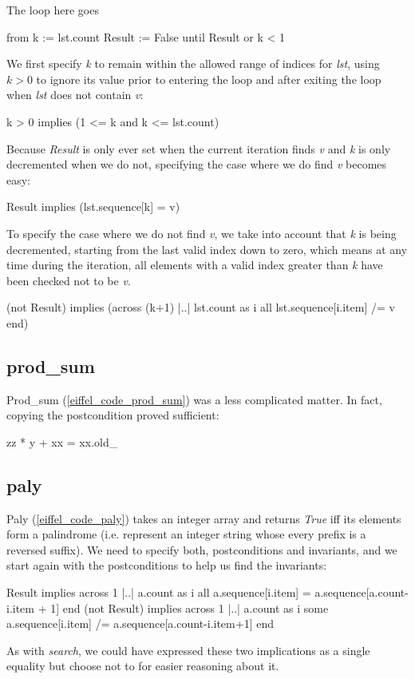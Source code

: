 The loop here goes
\begin{eSimple}
from
	k := lst.count
	Result := False
until
	Result or k < 1
\end{eSimple}
We first specify \emph{k} to remain within the allowed range of indices for \emph{lst}, using $k > 0$ to ignore its value prior to entering the loop and after exiting the loop when \emph{lst} does not contain \emph{v}:
\begin{eSimple}
k > 0 implies (1 <= k and k <= lst.count)
\end{eSimple}

Because \emph{Result} is only ever set when the current iteration finds \emph{v} and \emph{k} is only decremented when we do not, specifying the case where we do find \emph{v} becomes easy:
\begin{eSimple}
Result implies (lst.sequence[k] = v)
\end{eSimple}
To specify the case where we do not find \emph{v}, we take into account that \emph{k} is being decremented, starting from the last valid index down to zero, which means at any time during the iteration, all elements with a valid index greater than \emph{k} have been checked not to be \emph{v}.
\begin{eSimple}
(not Result) implies (across (k+1) |..| lst.count as i all lst.sequence[i.item] /= v end)
\end{eSimple}

\subsection{prod\_sum}
Prod\_sum (\ref{eiffel_code_prod_sum}) was a less complicated matter. In fact, copying the postcondition proved sufficient:
\begin{eSimple}
zz * y + xx = xx.old_
\end{eSimple}

\subsection{paly}
Paly (\ref{eiffel_code_paly}) takes an integer array and returns \emph{True} iff its elements form a palindrome (i.e. represent an integer string whose every prefix is a reversed suffix). We need to specify both, postconditions and invariants, and we start again with the postconditions to help us find the invariants:\\
\begin{eSimple}
Result implies across 1 |..| a.count as i all a.sequence[i.item] = a.sequence[a.count-i.item + 1] end
(not Result) implies across 1 |..| a.count as i some a.sequence[i.item] /= a.sequence[a.count-i.item+1] end
\end{eSimple}
As with \emph{search}, we could have expressed these two implications as a single equality but choose not to for easier reasoning about it.\\

